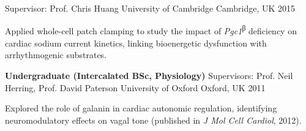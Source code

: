 \begin{cventries}
\cventry
  {Supervisor: Prof. Chris Huang}
  {University of Cambridge}
  {Cambridge, UK}
  {2015}
  {
    \begin{cvitems}
      \item {Applied whole-cell patch clamping to study the impact of \textit{Pgc1}\textsuperscript{β} deficiency on cardiac sodium current kinetics, linking bioenergetic dysfunction with arrhythmogenic substrates.}
    \end{cvitems}
  }

\textbf{Undergraduate (Intercalated BSc, Physiology)}  
\cventry
  {Supervisors: Prof. Neil Herring, Prof. David Paterson}
  {University of Oxford}
  {Oxford, UK}
  {2011}
  {
    \begin{cvitems}
      \item {Explored the role of galanin in cardiac autonomic regulation, identifying neuromodulatory effects on vagal tone (published in \textit{J Mol Cell Cardiol}, 2012).}
    \end{cvitems}
  }

\end{cventries}